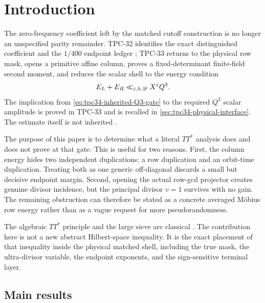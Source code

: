 \section{Introduction}
\label{sec:tpc34-introduction}

The zero-frequency coefficient left by the matched cutoff construction is
no longer an unspecified parity remainder.  TPC-32 identifies the exact
distinguished coefficient and the \(1/400\) endpoint ledger
\citep{WangTPC32}; TPC-33 returns to the physical row mask, opens a
primitive affine column, proves a fixed-determinant finite-field second
moment, and reduces the scalar shell to the energy condition
\begin{equation}
 E_L+E_R\ll_{\varepsilon,h,\mathscr D}X^\varepsilon Q^3.
 \label{eq:tpc34-inherited-Q3-gate}
\end{equation}
The implication from \eqref{eq:tpc34-inherited-Q3-gate} to the required
\(Q^2\) scalar amplitude is proved in TPC-33 and is recalled in
\cref{sec:tpc34-physical-interface}.  The estimate itself is not inherited
\citep{WangTPC33}.

The purpose of this paper is to determine what a literal \(TT^*\)
analysis does and does not prove at that gate.  This is useful for two
reasons.  First, the column energy hides two independent duplications: a
row duplication and an orbit-time duplication.  Treating both as one
generic off-diagonal discards a small but decisive endpoint margin.
Second, opening the actual row-gcd projector creates genuine divisor
incidence, but the principal divisor \(v=1\) survives with no gain.  The
remaining obstruction can therefore be stated as a concrete averaged
M\"obius row energy rather than as a vague request for more
pseudorandomness.

The algebraic \(TT^*\) principle and the large sieve are classical
\citep{Bombieri1965,IwaniecKowalski2004}.  The contribution here is not a
new abstract Hilbert-space inequality.  It is the exact placement of that
inequality inside the physical matched shell, including the true mask,
the ultra-divisor variable, the endpoint exponents, and the sign-sensitive
terminal layer.

\subsection{Main results}

